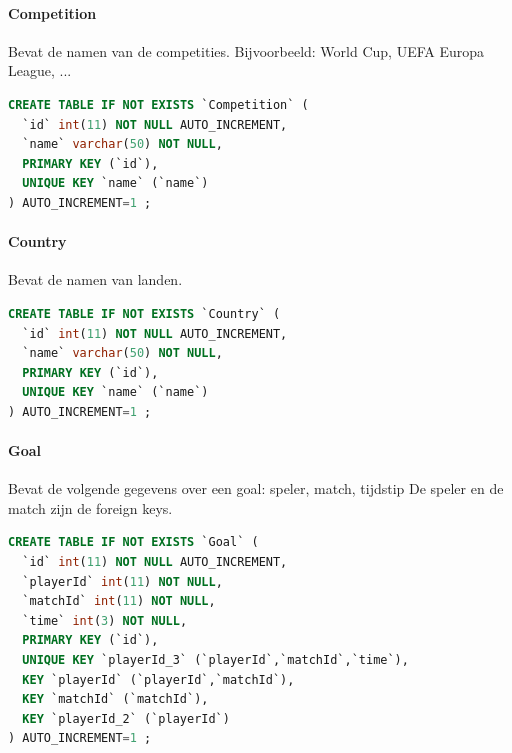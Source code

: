 \documentclass[11pt]{article}
\begin{document}
        
        
    \paragraph{Competition}
        Bevat de namen van de competities.
        Bijvoorbeeld: World Cup, UEFA Europa League, ...
        
        \begin{framed}
        \begin{lstlisting}[language=sql]
CREATE TABLE IF NOT EXISTS `Competition` (
  `id` int(11) NOT NULL AUTO_INCREMENT,
  `name` varchar(50) NOT NULL,
  PRIMARY KEY (`id`),
  UNIQUE KEY `name` (`name`)
) AUTO_INCREMENT=1 ;
        \end{lstlisting}
        \end{framed}
        
        
        
        
    \paragraph{Country}
        Bevat de namen van landen.
        
        \begin{framed}
        \begin{lstlisting}[language=sql]
CREATE TABLE IF NOT EXISTS `Country` (
  `id` int(11) NOT NULL AUTO_INCREMENT,
  `name` varchar(50) NOT NULL,
  PRIMARY KEY (`id`),
  UNIQUE KEY `name` (`name`)
) AUTO_INCREMENT=1 ;
        \end{lstlisting}
        \end{framed}
        
        
        
        
    \paragraph{Goal}
        Bevat de volgende gegevens over een goal:
            speler, match, tijdstip
        De speler en de match zijn de foreign keys.
        
        \begin{framed}
        \begin{lstlisting}[language=sql]
CREATE TABLE IF NOT EXISTS `Goal` (
  `id` int(11) NOT NULL AUTO_INCREMENT,
  `playerId` int(11) NOT NULL,
  `matchId` int(11) NOT NULL,
  `time` int(3) NOT NULL,
  PRIMARY KEY (`id`),
  UNIQUE KEY `playerId_3` (`playerId`,`matchId`,`time`),
  KEY `playerId` (`playerId`,`matchId`),
  KEY `matchId` (`matchId`),
  KEY `playerId_2` (`playerId`)
) AUTO_INCREMENT=1 ;
        \end{lstlisting}
        \end{framed}
        
\end{document}
